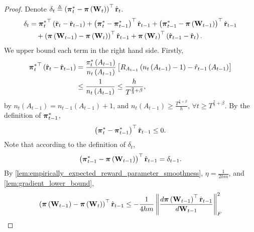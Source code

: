 \begin{proof}
    Denote $\delta_t \triangleq \left( {{\boldsymbol{\pi}}_t^*} - {\boldsymbol{\pi}}\left( {\mathbf{W}}_t \right) \right)^\top \hat{{\mathbf{r}}}_t$.
\begin{equation}
\label{eq:dynamic_regret_decomposition}
\begin{split}
    \delta_t &= {{\boldsymbol{\pi}}_t^*}^\top \left( \hat{{\mathbf{r}}}_t - \hat{{\mathbf{r}}}_{t-1}\right) + \left( {{\boldsymbol{\pi}}_t^*} - {{\boldsymbol{\pi}}_{t-1}^*} \right)^\top \hat{{\mathbf{r}}}_{t-1}  + \left( {{\boldsymbol{\pi}}_{t-1}^*} - {\boldsymbol{\pi}}\left( {\mathbf{W}}_{t-1} \right) \right)^\top \hat{{\mathbf{r}}}_{t-1} \\
    &\quad + \left(  {\boldsymbol{\pi}}\left( {\mathbf{W}}_{t-1} \right) - {\boldsymbol{\pi}}\left( {\mathbf{W}}_t \right) 
    \right)^\top \hat{{\mathbf{r}}}_{t-1} + {\boldsymbol{\pi}}\left( {\mathbf{W}}_t \right)^\top \left( \hat{{\mathbf{r}}}_{t-1} - \hat{{\mathbf{r}}}_t \right).
\end{split}
\end{equation}
We upper bound each term in the right hand side. Firstly,
\begin{equation*}
\begin{split}
    {{\boldsymbol{\pi}}_t^*}^\top \left( \hat{{\mathbf{r}}}_t - \hat{{\mathbf{r}}}_{t-1}\right) &= \frac{\pi_{t}^*\left(A_{t-1}\right)}{n_{t}\left(A_{t-1}\right)} \left[ R_{ A_{t-1}}\left( n_{t}\left(A_{t-1}\right) -1 \right) - \hat{r}_{t-1}\left(A_{t-1}\right) \right] \\
    &\le \frac{1}{n_{t}\left(A_{t-1}\right)} \le \frac{h}{T^{\frac{2}{3} + \beta}},
\end{split}
\end{equation*}
by $n_{t}\left(A_{t-1}\right) = n_{t-1}\left(A_{t-1}\right) + 1$, and $n_{t}\left(A_{t-1}\right) \ge \frac{T^{\frac{2}{3} + \beta}}{h}$, $\forall t \ge T^{\frac{2}{3} + \beta}$. By the definition of ${{\boldsymbol{\pi}}_{t-1}^*}$,
\begin{equation*}
    \left( {{\boldsymbol{\pi}}_t^*} - {{\boldsymbol{\pi}}_{t-1}^*} \right)^\top \hat{{\mathbf{r}}}_{t-1} \le 0.
\end{equation*}
Note that according to the definition of $\delta_t$,
\begin{equation*}
    \left( {{\boldsymbol{\pi}}_{t-1}^*} - {\boldsymbol{\pi}}\left( {\mathbf{W}}_{t-1} \right) \right)^\top \hat{{\mathbf{r}}}_{t-1} = \delta_{t-1}.
\end{equation*}
By \cref{lem:empirically_expected_reward_parameter_smoothness}, $\eta = \frac{1}{2 h m}$, and \cref{lem:gradient_lower_bound},
\begin{equation*}
\begin{split}
    \left( \rvpi\left( \rmW_{t-1} \right) - \rvpi\left( \rmW_t \right) \right)^\top \hat{\rvr}_{t-1} &\le - \frac{1}{4 h m} \left\| \frac{d \rvpi\left( \rmW_{t-1} \right)^\top \hat{\rvr}_{t-1}}{d \rmW_{t-1}} \right\|_F^2 \\

\end{split}
\end{equation*}
\end{proof}
